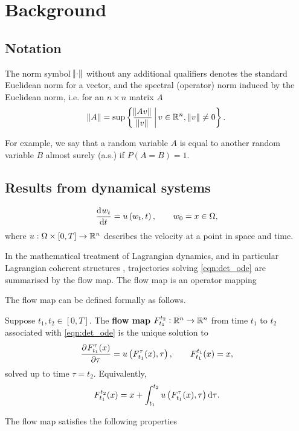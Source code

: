 
\chapter{Background}


\section{Notation}


The norm symbol \(\norm{\cdot}\) without any additional qualifiers denotes the standard Euclidean norm for a vector, and the spectral (operator) norm induced by the Euclidean norm, i.e. for an \(n \times n\) matrix \(A\)
\[
	\norm{A} = \sup\left\{\frac{\norm{Av}}{\norm{v}}\,\middle|\,v \in \mathbb{R}^n, \, \norm{v} \neq 0\right\}.
\]


For example, we say that a random variable \(A\) is equal to another random variable \(B\) almost surely (a.s.) if \(P\left(A = B\right) = 1\).




\section{Results from dynamical systems}
\begin{equation}
	\dod{w_t}{t} = u\left(w_t, t\right), \qquad w_0 = x \in \Omega,
	\label{eqn:det_ode}
\end{equation}
where \(u: \Omega \times[0,T] \to \mathbb{R}^n\) describes the velocity at a point in space and time.

In the mathematical treatment of Lagrangian dynamics, and in particular Lagrangian coherent structures \citep{BalasuriyaEtAl_2018_GeneralizedLagrangianCoherent}, trajectories solving \eqref{eqn:det_ode} are summarised by the flow map.
The flow map is an operator mapping 

The flow map can be defined formally as follows.
\begin{defn}
	Suppose \(t_1, t_2 \in [0,T]\).
	The \textbf{flow map} \(F_{t_1}^{t_2}: \mathbb{R}^n \to \mathbb{R}^n\) from time \(t_1\) to \(t_2\) associated with \eqref{eqn:det_ode} is the unique solution to
	\begin{equation}
		\dpd{F_{t_1}^{\tau}(x)}{\tau} = u\left(F_{t_1}^\tau(x), \tau\right), \qquad F_{t_1}^{t_1}(x) = x,
		\label{eqn:flow_map_ode}
	\end{equation}
	solved up to time \(\tau = t_2\).
	Equivalently,
	\[
		F_{t_1}^{t_2}(x) = x + \int_{t_1}^{t_2}{u\left(F_{t_1}^\tau(x), \tau\right)\dif\tau}.
	\]
\end{defn}
The flow map satisfies the following properties



